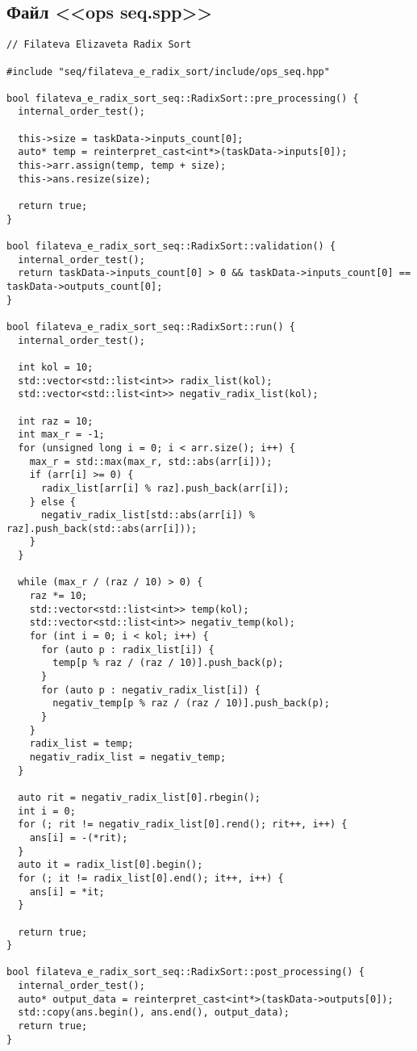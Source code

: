 \documentclass[a4paper, 14pt]{article}
\begin{document}
    
	\newpage
	\subsection*{\centering Файл <<ops seq.spp>>}
	\begin{verbatim}
// Filateva Elizaveta Radix Sort

#include "seq/filateva_e_radix_sort/include/ops_seq.hpp"

bool filateva_e_radix_sort_seq::RadixSort::pre_processing() {
  internal_order_test();

  this->size = taskData->inputs_count[0];
  auto* temp = reinterpret_cast<int*>(taskData->inputs[0]);
  this->arr.assign(temp, temp + size);
  this->ans.resize(size);

  return true;
}

bool filateva_e_radix_sort_seq::RadixSort::validation() {
  internal_order_test();
  return taskData->inputs_count[0] > 0 && taskData->inputs_count[0] == taskData->outputs_count[0];
}

bool filateva_e_radix_sort_seq::RadixSort::run() {
  internal_order_test();

  int kol = 10;
  std::vector<std::list<int>> radix_list(kol);
  std::vector<std::list<int>> negativ_radix_list(kol);

  int raz = 10;
  int max_r = -1;
  for (unsigned long i = 0; i < arr.size(); i++) {
    max_r = std::max(max_r, std::abs(arr[i]));
    if (arr[i] >= 0) {
      radix_list[arr[i] % raz].push_back(arr[i]);
    } else {
      negativ_radix_list[std::abs(arr[i]) % raz].push_back(std::abs(arr[i]));
    }
  }

  while (max_r / (raz / 10) > 0) {
    raz *= 10;
    std::vector<std::list<int>> temp(kol);
    std::vector<std::list<int>> negativ_temp(kol);
    for (int i = 0; i < kol; i++) {
      for (auto p : radix_list[i]) {
        temp[p % raz / (raz / 10)].push_back(p);
      }
      for (auto p : negativ_radix_list[i]) {
        negativ_temp[p % raz / (raz / 10)].push_back(p);
      }
    }
    radix_list = temp;
    negativ_radix_list = negativ_temp;
  }

  auto rit = negativ_radix_list[0].rbegin();
  int i = 0;
  for (; rit != negativ_radix_list[0].rend(); rit++, i++) {
    ans[i] = -(*rit);
  }
  auto it = radix_list[0].begin();
  for (; it != radix_list[0].end(); it++, i++) {
    ans[i] = *it;
  }

  return true;
}

bool filateva_e_radix_sort_seq::RadixSort::post_processing() {
  internal_order_test();
  auto* output_data = reinterpret_cast<int*>(taskData->outputs[0]);
  std::copy(ans.begin(), ans.end(), output_data);
  return true;
}

	\end{verbatim}
\end{document}
